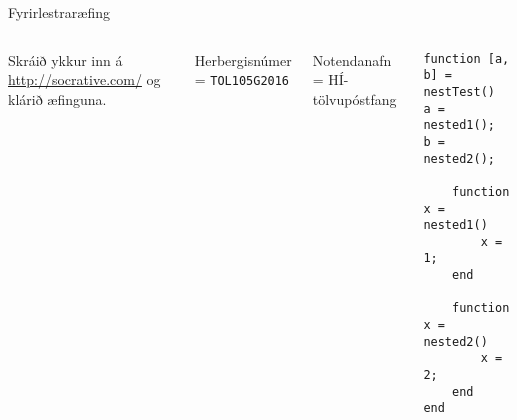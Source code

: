 \documentclass{beamer}
\begin{document}
\begin{frame}[fragile]{Fyrirlestraræfing}
\begin{columns}
Skráið ykkur inn á \url{http://socrative.com/} og klárið æfinguna.

Herbergisnúmer = \texttt{TOL105G2016}

Notendanafn = HÍ-tölvupóstfang
\begin{verbatim}
function [a, b] = nestTest()
a = nested1();
b = nested2();

    function x = nested1()
        x = 1;
    end

    function x = nested2()
        x = 2;
    end
end
\end{verbatim}

\end{columns}
\end{frame}
\end{document}
